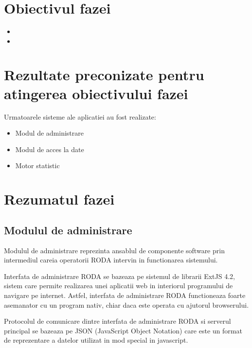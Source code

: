 \documentclass[a4paper, 10pt]{article}
\begin{document}
{\section{Obiectivul fazei}


\begin{itemize}
\item

\item


\end{itemize}

\section{Rezultate preconizate pentru atingerea obiectivului fazei}

Urmatoarele sisteme ale aplicatiei au fost realizate:
\begin{itemize}
\item
Modul de administrare
\item
Modul de acces la date
\item
Motor statistic
\end{itemize}

\section{Rezumatul fazei}

\medskip


\subsection{Modulul de administrare}

Modulul de administrare reprezinta ansablul de componente software
prin intermediul careia operatorii RODA intervin in functionarea sistemului.

Interfata de administrare RODA se bazeaza pe sistemul de librarii
ExtJS 4.2, sistem care permite realizarea unei aplicatii web in interiorul
programului de navigare pe internet. Astfel, interfata de administrare
RODA functioneaza foarte asemanator cu un program nativ, chiar daca
este operata cu ajutorul browserului. 

Protocolul de comunicare dintre interfata de administrare RODA si
serverul principal se bazeaza pe JSON (JavaScript Object Notation)
care este un format de reprezentare a datelor utilizat in mod special
in javascript. 

}
\end{document}
